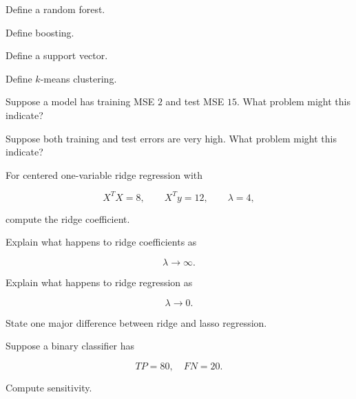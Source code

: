 \begin{exercise}[1]
Define a random forest.
\end{exercise}

\begin{exercise}[1]
Define boosting.
\end{exercise}

\begin{exercise}[1]
Define a support vector.
\end{exercise}

\begin{exercise}[1]
Define \(k\)-means clustering.
\end{exercise}

\begin{exercise}[2]
Suppose a model has training MSE \(2\) and test MSE \(15\). What problem
might this indicate?
\end{exercise}

\begin{exercise}[2]
Suppose both training and test errors are very high. What problem might
this indicate?
\end{exercise}

\begin{exercise}[2]
For centered one-variable ridge regression with

\[
X^TX=8,
\qquad
X^Ty=12,
\qquad
\lambda=4,
\]

compute the ridge coefficient.
\end{exercise}

\begin{exercise}[2]
Explain what happens to ridge coefficients as

\[
\lambda\to\infty.
\]
\end{exercise}

\begin{exercise}[2]
Explain what happens to ridge regression as

\[
\lambda\to0.
\]
\end{exercise}

\begin{exercise}[2]
State one major difference between ridge and lasso regression.
\end{exercise}

\begin{exercise}[2]
Suppose a binary classifier has

\[
TP=80,
\quad
FN=20.
\]

Compute sensitivity.
\end{exercise}

